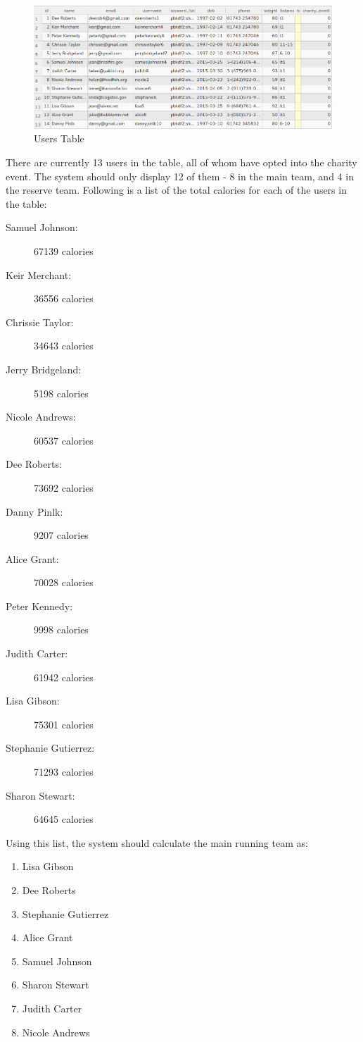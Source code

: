 \documentclass{article}[12pt,a4paper]
\begin{document}
{\begin{figure}[h!]
    \includegraphics[scale=0.35]{images/testing/charity_team/users}
    \caption{Users Table}
\end{figure}

There are currently 13 users in the table, all of whom have opted into the charity event. The system should only display 12 of them - 8 in the main team, and 4 in the reserve team. Following is a list of the total calories for each of the users in the table:

\begin{description}
  \item[Samuel Johnson:] 67139 calories
  \item[Keir Merchant:] 36556 calories
  \item[Chrissie Taylor:] 34643 calories
  \item[Jerry Bridgeland:] 5198 calories
  \item[Nicole Andrews:] 60537 calories
  \item[Dee Roberts:] 73692 calories
  \item[Danny Pinlk:] 9207 calories
  \item[Alice Grant:] 70028 calories
  \item[Peter Kennedy:] 9998 calories
  \item[Judith Carter:] 61942 calories
  \item[Lisa Gibson:] 75301 calories
  \item[Stephanie Gutierrez:] 71293 calories
  \item[Sharon Stewart:] 64645 calories
\end{description}

\clearpage

Using this list, the system should calculate the main running team as:

\begin{enumerate}
  \item Lisa Gibson
  \item Dee Roberts
  \item Stephanie Gutierrez
  \item Alice Grant
  \item Samuel Johnson
  \item Sharon Stewart
  \item Judith Carter
  \item Nicole Andrews\\
\end{enumerate}

}
\end{document}
